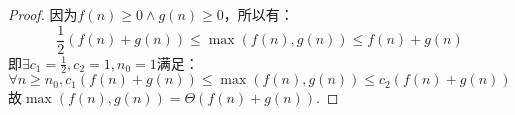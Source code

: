 \begin{proof}
    因为$f(n) \ge 0 \wedge g(n) \ge 0$，所以有：
    $$\frac{1}{2}(f(n)+g(n)) \le \max(f(n),g(n)) \le f(n)+g(n)$$
    即$\exists c_1 = \frac{1}{2},c_2=1,n_0=1$满足：
    $$\forall n \ge n_0, c_1(f(n)+g(n)) \le \max(f(n),g(n)) \le c_2(f(n)+g(n))$$
    故$\max(f(n),g(n))=\Theta(f(n)+g(n))$.
\end{proof}
